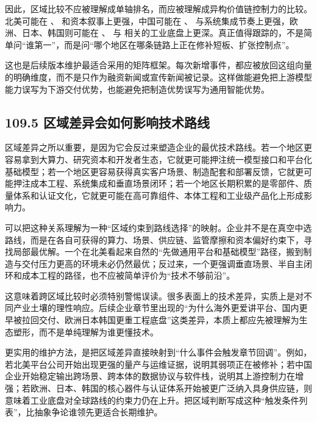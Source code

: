 因此，区域比较不应被理解成单轴排名，而应被理解成异构价值链控制力的比较。北美可能在 \texttt{}、\texttt{} 和资本叙事上更强，中国可能在 \texttt{}、\texttt{} 与系统集成节奏上更强，欧洲、日本、韩国则可能在 \texttt{}、\texttt{} 与 \texttt{} 相关的工业底盘上更深。真正值得跟踪的，不是简单问“谁第一”，而是问“哪个地区在哪条链路上正在修补短板、扩张控制点”。

这也是后续版本维护最适合采用的矩阵框架。每次新增事件，都应被放回这组向量的明确维度，而不是只作为融资新闻或宣传新闻被记录。这样做能避免把上游模型能力误写为下游交付优势，也能避免把制造优势误写为通用智能优势。

\subsection*{109.5 区域差异会如何影响技术路线}


区域差异之所以重要，是因为它会反过来塑造企业的最优技术路线。若一个地区更容易拿到大算力、研究资本和开发者生态，它就更可能押注统一模型接口和平台化基础模型；若一个地区更容易获得真实客户场景、制造配套和部署反馈，它就更可能押注成本工程、系统集成和垂直场景闭环；若一个地区长期积累的是零部件、质量体系和认证文化，它就更可能在高可靠组件、本体工程和工业级产品化上形成影响力。

可以把这种关系理解为一种“区域约束到路线选择”的映射。企业并不是在真空中选路线，而是在各自可获得的算力、场景、供应链、监管摩擦和资本偏好约束下，寻找局部最优解。一个在北美看起来自然的“先做通用平台和基础模型”路径，搬到制造与交付压力更高的环境未必仍然最优；反过来，一个更强调垂直场景、半自主闭环和成本工程的路径，也不应被简单评价为“技术不够前沿”。

这意味着跨区域比较时必须特别警惕误读。很多表面上的技术差异，实质上是对不同产业土壤的理性响应。后续企业章节里出现的“为什么海外更爱讲平台、国内更早被拉回交付、欧洲日本韩国更重工程底盘”这类差异，本质上都应先被理解为生态塑形，而不是单纯理解为谁更懂技术。

更实用的维护方法，是把区域差异直接映射到“什么事件会触发章节回调”。例如，若北美平台公司开始出现更强的量产与运维证据，说明其弱项正在被修补；若中国企业开始稳定输出跨场景、跨本体的数据协议与软件栈，说明其上游控制力在增强；若欧洲、日本、韩国的核心器件与认证体系开始被更广泛纳入具身供应链，则意味着工业底盘对全球路线的约束力仍在上升。把区域判断写成这种“触发条件列表”，比抽象争论谁领先更适合长期维护。

